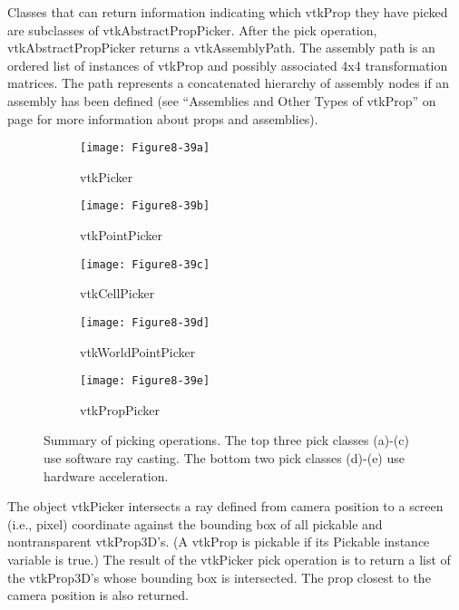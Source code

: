 Classes that can return information indicating which vtkProp they have picked are subclasses of vtkAbstractPropPicker. After the pick operation, vtkAbstractPropPicker returns a vtkAssemblyPath. The assembly path is an ordered list of instances of vtkProp and possibly associated 4x4 transformation matrices. The path represents a concatenated hierarchy of assembly nodes if an assembly has been defined (see ``Assemblies and Other Types of vtkProp'' on page \pageref{subsubsec:assemblies_vtkprop} for more information about props and assemblies).

\begin{figure}[!htb]
    \centering
    \begin{subfigure}{0.32\linewidth}
        \centering
        \texttt{[image: Figure8-39a]}
        \caption{vtkPicker}\label{fig:Figure8-39a}
    \end{subfigure}
    \hfill
    \begin{subfigure}{0.32\linewidth}
        \centering
        \texttt{[image: Figure8-39b]}
        \caption{vtkPointPicker}\label{fig:Figure8-39b}
    \end{subfigure}%
    \hfill
    \begin{subfigure}{0.32\linewidth}
        \centering
        \texttt{[image: Figure8-39c]}
        \caption{vtkCellPicker}\label{fig:Figure8-39c}
    \end{subfigure}%
    \hfill
    \begin{subfigure}{0.48\linewidth}
        \centering
        \texttt{[image: Figure8-39d]}
        \caption{vtkWorldPointPicker}\label{fig:Figure8-39d}
    \end{subfigure}%
    \hfill
    \begin{subfigure}{0.48\linewidth}
        \centering
        \texttt{[image: Figure8-39e]}
        \caption{vtkPropPicker}\label{fig:Figure8-39e}
    \end{subfigure}%
    \caption{Summary of picking operations. The top three pick classes (a)-(c) use software ray casting. The bottom two pick classes (d)-(e) use hardware acceleration.}
    \label{fig:Figure8-39}
\end{figure}

The object vtkPicker intersects a ray defined from camera position to a screen (i.e., pixel) coordinate against the bounding box of all pickable and nontransparent vtkProp3D's. (A vtkProp is pickable if its Pickable instance variable is true.) The result of the vtkPicker pick operation is to return a list of the vtkProp3D's whose bounding box is intersected. The prop closest to the camera position is also returned.

